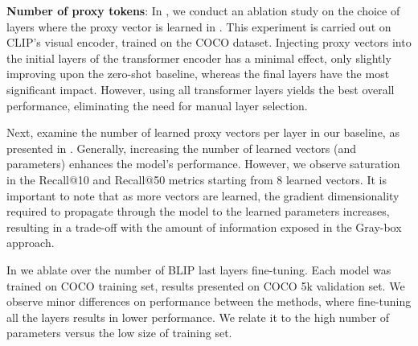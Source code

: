 


{\bf Number of proxy tokens}: In , we conduct an ablation study on the choice of layers where the proxy vector is learned in \oursp. This experiment is carried out on CLIP's visual encoder, trained on the COCO dataset. Injecting proxy vectors into the initial layers of the transformer encoder has a minimal effect, only slightly improving upon the zero-shot baseline, whereas the final layers have the most significant impact. However, using all transformer layers yields the best overall performance, eliminating the need for manual layer selection.

Next, examine the number of learned proxy vectors per layer in our \oursp baseline, as presented in . Generally, increasing the number of learned vectors (and parameters) enhances the model's performance. However, we observe saturation in the Recall@10 and Recall@50 metrics starting from 8 learned vectors. It is important to note that as more vectors are learned, the gradient dimensionality required to propagate through the model to the learned parameters increases, resulting in a trade-off with the amount of information exposed in the Gray-box approach.


In  we ablate over the number of BLIP last layers fine-tuning. Each model was trained on COCO training set, results presented on COCO 5k validation set. We observe minor differences on performance between the methods, where fine-tuning all the layers results in lower performance. We relate it to the high number of parameters versus the low size of training set.

